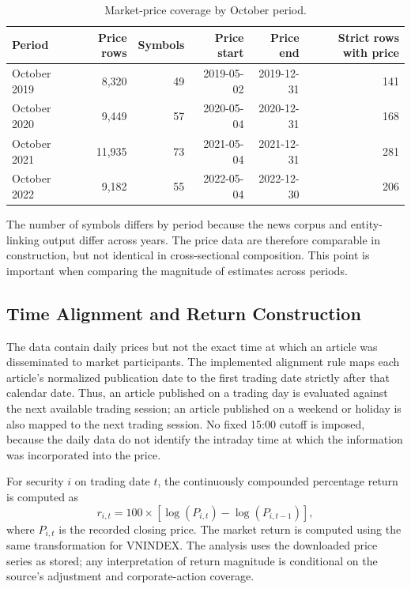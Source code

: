 \begin{table}[htbp]
\centering
\small
\caption{Market-price coverage by October period.}
\label{tab:multi-year-price-coverage}
\begin{tabular}{lrrrrr}
\toprule
\textbf{Period} & \textbf{Price rows} & \textbf{Symbols} & \textbf{Price start} & \textbf{Price end} & \textbf{Strict rows with price} \\
\midrule
October 2019 & 8,320 & 49 & 2019-05-02 & 2019-12-31 & 141 \\
October 2020 & 9,449 & 57 & 2020-05-04 & 2020-12-31 & 168 \\
October 2021 & 11,935 & 73 & 2021-05-04 & 2021-12-31 & 281 \\
October 2022 & 9,182 & 55 & 2022-05-04 & 2022-12-30 & 206 \\
\bottomrule
\end{tabular}
\end{table}

The number of symbols differs by period because the news corpus and entity-linking output differ across years. The price data are therefore comparable in construction, but not identical in cross-sectional composition. This point is important when comparing the magnitude of estimates across periods.

\subsection{Time Alignment and Return Construction}
\label{subsec:time-alignment-multi-year}

The data contain daily prices but not the exact time at which an article was disseminated to market participants. The implemented alignment rule maps each article's normalized publication date to the first trading date strictly after that calendar date. Thus, an article published on a trading day is evaluated against the next available trading session; an article published on a weekend or holiday is also mapped to the next trading session. No fixed 15:00 cutoff is imposed, because the daily data do not identify the intraday time at which the information was incorporated into the price.

For security $i$ on trading date $t$, the continuously compounded percentage return is computed as
\begin{equation}
 r_{i,t}=100\times\left[\log(P_{i,t})-\log(P_{i,t-1})\right],
\end{equation}
where $P_{i,t}$ is the recorded closing price. The market return is computed using the same transformation for VNINDEX. The analysis uses the downloaded price series as stored; any interpretation of return magnitude is conditional on the source's adjustment and corporate-action coverage.

